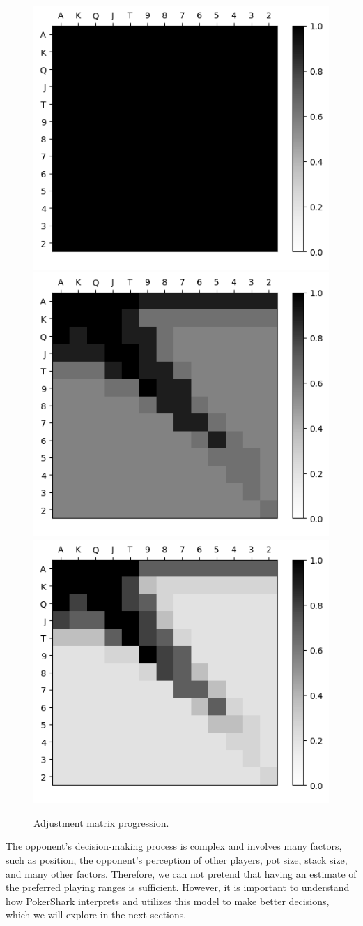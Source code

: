\begin{figure}[htp]

    \centering
    \includegraphics[width=.3\textwidth]{graphics/round_1.png}\hfill
    \includegraphics[width=.3\textwidth]{graphics/round_5.png}\hfill
    \includegraphics[width=.3\textwidth]{graphics/round_15.png}
    
    \caption{Adjustment matrix progression.}
    \label{fig:matrixProgression}
    
\end{figure}

The opponent's decision-making process is complex and involves many factors, such as position, the opponent's perception of other players, pot size, stack size, and many other factors. Therefore, we can not pretend that having an estimate of the preferred playing ranges is sufficient. However, it is important to understand how PokerShark interprets and utilizes this model to make better decisions, which we will explore in the next sections.


